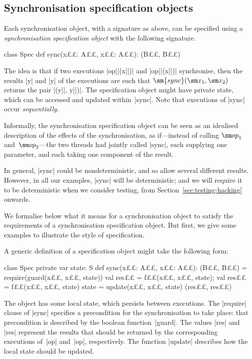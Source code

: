 
\subsection{Synchronisation specification objects}
\label{sec:sync-spec-objects}

Each synchronisation object, with a signature as above, can be specified using
a \emph{synchronisation specification object} with the following signature.
%
\begin{scala}
class Spec{
  def sync(x££: A££, x££: A££): (B££, B££)
}
\end{scala}
%
The idea is that if two executions |op||(x||)| and |op||(x||)|
synchronise, then the results |y| and |y| of the executions are such
that $\sm{sync}(\sm x_1, \sm x_2)$ returns the pair |(y||, y||)|.
The specification object might have private state, which can be accessed and
updated within~|sync|.  Note that executions of |sync| occur
\emph{sequentially}.  

Informally, the synchronisation specification object can be seen as an
idealised description of the effects of the synchronisation, as if---instead
of calling $\op_1$ and~$\op_2$---the two threads had jointly called |sync|,
each supplying one parameter, and each taking one component of the result.

In general, |sync| could be nondeterministic, and so allow several different
results.  However, in all our examples, |sync| will be deterministic; and we
will require it to be deterministic when we consider testing, from
Section~\ref{sec:testing-hacking} onwards.


We formalise below what it means for a synchronisation object to satisfy the
requirements of a synchronisation specification object.  But first, we give
some examples to illustrate the style of specification. 

A generic definition of a specification object might take the following form: 
%
\pagebreak[3]
\begin{scala}
class Spec{
  private var state: S
  def sync(x££: A££, x££: A££): (B££, B££) = {
    require(guard(x££, x££, state))
    val res££ = f££(x££, x££, state); val res££ = f££(x££, x££, state)
    state = update(x££, x££, state)
    (res££, res££)
  }
}
\end{scala}
%
The object has some local state, which persists between executions.  The
|require| clause of |sync| specifies a precondition for the synchronisation to
take place: that precondition is described by the boolean function~|guard|.
The values |res| and |res| represent the results that should be returned
by the corresponding executions of~|op| and~|op|, respectively.  The
function |update| describes how the local state should be updated.

